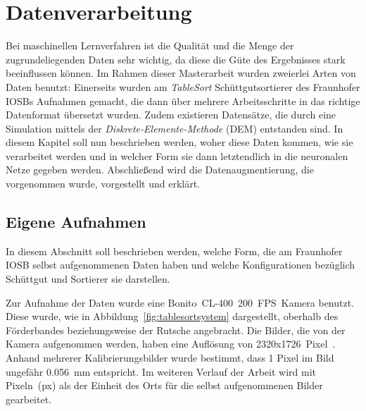 \chapter{Datenverarbeitung}
\label{cap:data}

Bei maschinellen Lernverfahren ist die Qualität und die Menge der zugrundeliegenden Daten sehr wichtig,
da diese die Güte des Ergebnisses stark beeinflussen können.
Im Rahmen dieser Masterarbeit wurden zweierlei Arten von Daten benutzt:
Einerseits wurden am \textit{TableSort} Schüttgutsortierer des Fraunhofer IOSBs Aufnahmen gemacht, 
die dann über mehrere Arbeitsschritte in das richtige Datenformat übersetzt wurden.
Zudem existieren Datensätze, die durch eine Simulation mittels der \textit{Diskrete-Elemente-Methode} (DEM) entstanden sind. 
In diesem Kapitel soll nun beschrieben werden, woher diese Daten kommen, wie sie verarbeitet werden 
und in welcher Form sie dann letztendlich in die neuronalen Netze gegeben werden.
Abschließend wird die Datenaugmentierung, die vorgenommen wurde, vorgestellt und erklärt.





\section{Eigene Aufnahmen}

In diesem Abschnitt soll beschrieben werden, welche Form, die am Fraunhofer IOSB selbst aufgenommenen Daten haben und welche Konfigurationen bezüglich Schüttgut und Sortierer sie darstellen.





Zur Aufnahme der Daten wurde eine Bonito~CL-400~200~FPS~Kamera benutzt. 
Diese wurde, wie in Abbildung~\ref{fig:tablesortsystem} dargestellt, oberhalb des Förderbandes beziehungsweise der Rutsche angebracht.
Die Bilder, die von der Kamera aufgenommen werden, haben eine Auflösung von 2320x1726~Pixel~\cite{alliedvisiontechnologiesgmbh2014}.
Anhand mehrerer Kalibrierungsbilder wurde bestimmt, dass 1 Pixel im Bild ungefähr \SI{0.056}{\milli\meter} entspricht.
Im weiteren Verlauf der Arbeit wird mit Pixeln~(px) als der Einheit des Orts für die selbst aufgenommenen Bilder gearbeitet.

